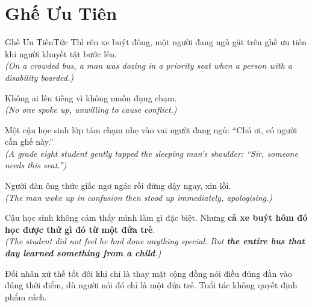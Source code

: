 \section{Ghế Ưu Tiên}
\begin{truyen}{Ghế Ưu Tiên}{Tức Thì}
rên xe buýt đông, một người đang ngủ gật trên ghế ưu tiên khi người khuyết tật bước lên.\\
\textit{(On a crowded bus, a man was dozing in a priority seat when a person with a disability boarded.)}

Không ai lên tiếng vì không muốn đụng chạm.\\
\textit{(No one spoke up, unwilling to cause conflict.)}

Một cậu học sinh lớp tám chạm nhẹ vào vai người đang ngủ: ``Chú ơi, có người cần ghế này.''\\
\textit{(A grade eight student gently tapped the sleeping man's shoulder: ``Sir, someone needs this seat.'')}

Người đàn ông thức giấc ngơ ngác rồi đứng dậy ngay, xin lỗi.\\
\textit{(The man woke up in confusion then stood up immediately, apologising.)}

Cậu học sinh không cảm thấy mình làm gì đặc biệt. Nhưng \textbf{cả xe buýt hôm đó học được thứ gì đó từ một đứa trẻ}.\\
\textit{(The student did not feel he had done anything special. But \textbf{the entire bus that day learned something from a child}.)}
\end{truyen}
\begin{baihoc}
  Đối nhân xử thế tốt đôi khi chỉ là thay mặt cộng đồng nói điều đúng đắn vào đúng thời điểm, dù người nói đó chỉ là một đứa trẻ. Tuổi tác không quyết định phẩm cách.
\end{baihoc}

